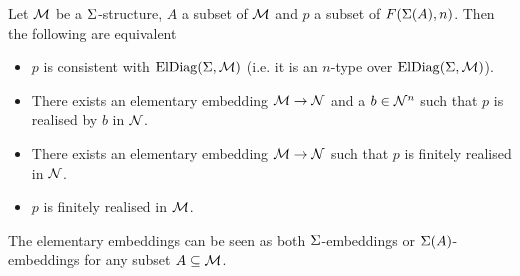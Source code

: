 \begin{lem}
    Let $\mathcal{M}$ be a $\Sigma$-structure, 
    $A$ a subset of ${\mathcal{M}}$ and $p$ a subset of $F(\Sigma(A),n)$.
    Then the following are equivalent 
    \begin{itemize}
        \item $p$ is consistent with $\mathrm{ElDiag}(\Sigma,\mathcal{M})$ 
            (i.e. it is an $n$-type over $\mathrm{ElDiag}(\Sigma,\mathcal{M})$).
        \item There exists an elementary embedding $\mathcal{M} \to \mathcal{N}$ 
            and a $b \in {\mathcal{N}}^n$ such that $p$ 
            is realised by $b$ in $\mathcal{N}$.
        \item There exists an elementary embedding $\mathcal{M} \to \mathcal{N}$ 
            such that $p$ is finitely realised in $\mathcal{N}$.
        \item $p$ is finitely realised in $\mathcal{M}$.
    \end{itemize}
    The elementary embeddings can be seen as both $\Sigma$-embeddings or 
    $\Sigma(A)$-embeddings for any subset $A \subseteq \mathcal{M}$.
\end{lem}

